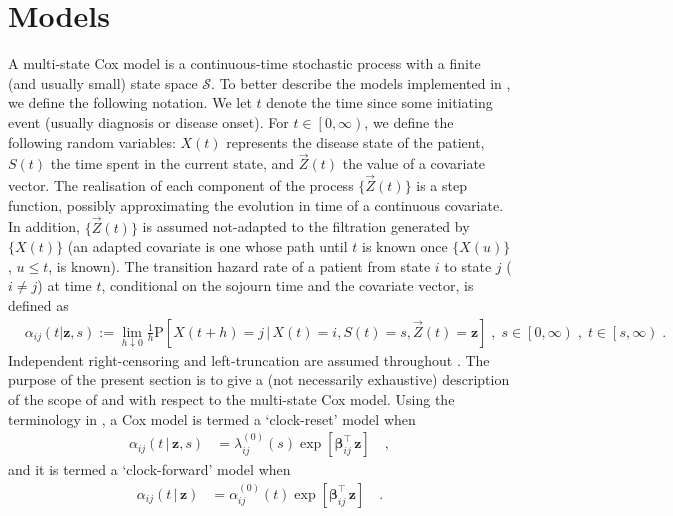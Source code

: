 \section{Models}
A multi-state Cox model is a continuous-time stochastic process with a finite (and usually small) state space $\mathcal{S}$. 
 To better describe the models implemented in , we define the following notation. We let $t$ denote the time since some initiating event (usually diagnosis or disease onset). For $t \in \left[0, \infty\right)$, we define the following random variables: $X(t)$ represents the disease state of the patient, $S(t)$ the time spent in the current state,  and $\vec{Z}\left(t\right)$  the value of a covariate vector.  
The realisation of each component of the process $\lbrace\vec{Z}\left(t\right)\rbrace$ is a step function, possibly approximating the evolution in time of a continuous covariate.
 In addition, $\lbrace\vec{Z}\left(t\right)\rbrace$ is assumed not-adapted to the filtration generated by $\lbrace X\left(t\right)\rbrace$ (an adapted covariate is one whose path until $t$ is known once $\lbrace X \left(u\right)\rbrace$, $u \leq t$, is known). 
 The transition hazard rate of a patient from state $i$ to state $j$ ($i\neq j$) at time $t$, conditional on the sojourn time and the covariate vector, is defined as
 \begin{align*}
 &\alpha_{ij}\left(t|\mathbf{z},s \right):=\lim_{h \downarrow 0}\frac{1}{h}\mathrm{P}\left[X(t+h)=j\,|\,X(t)=i,S(t)=s,\vec{Z}(t)=\mathbf{z} \right]\;, \;s\in \left[0,\infty\right)\;,\;t\in \left[s,\infty\right)\;.
\end{align*}
Independent right-censoring and left-truncation are assumed throughout \citep[][p. 57]{Aalen2008}.  The purpose of the present section is to give a (not necessarily exhaustive) description of the scope of  and  with respect to the multi-state Cox model.  Using the terminology in \citet{Putter2011},  a Cox model is termed a `clock-reset' model when
\begin{align}
\label{eq:clock_reset_Cox}
\alpha_{ij}\left(t\,|\,\mathbf{z}, s\right)&=\lambda_{ij}^{(0)}\left(s\right)\exp\left[ \boldsymbol{\beta}^{\intercal}_{ij}\,\mathbf{z}\right] \quad,
\end{align}
and it is termed a `clock-forward' model when
\begin{align}
\label{eq:clock_forward_Cox}
\alpha_{ij}\left(t\,|\,\mathbf{z}\right)&=\alpha_{ij}^{(0)}\left(t\right)\exp\left[ \boldsymbol{\beta}^{\intercal}_{ij}\,\mathbf{z}\right] \quad.
\end{align}
